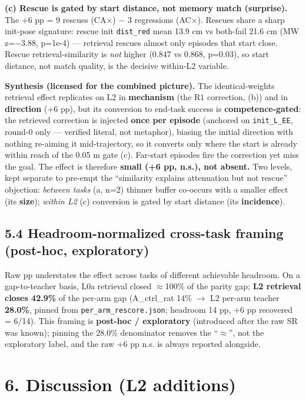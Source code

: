 \textbf{(c) Rescue is gated by start distance, not memory match (surprise).}
The +6 pp = 9 rescues (C\checkmark A$\times$) $-$ 3 regressions (A\checkmark C$\times$). Rescues share a
sharp init-pose signature: rescue init \texttt{dist\_red} mean 13.9 cm vs
both-fail 21.6 cm (MW z=$-$3.88, p=1e-4) --- retrieval rescues almost only
episodes that start close. Rescue retrieval-similarity is \emph{not} higher
(0.847 vs 0.868, p=0.03), so start distance, not match quality, is the
decisive within-L2 variable.

\textbf{Synthesis (licensed for the combined picture).} The identical-weights
retrieval effect replicates on L2 in \textbf{mechanism} (the R1 correction, (b))
and in \textbf{direction} (+6 pp), but its conversion to end-task success is
\textbf{competence-gated}: the retrieved correction is injected \textbf{once per
episode} (anchored on \texttt{init\_L\_EE}, round-0 only --- verified literal, not
metaphor), biasing the initial direction with nothing re-aiming it
mid-trajectory, so it converts only where the start is already within
reach of the 0.05 m gate (c). Far-start episodes fire the correction yet
miss the goal. The effect is therefore \textbf{small (+6 pp, n.s.), not
absent.} Two levels, kept separate to pre-empt the ``similarity explains
attenuation but not rescue'' objection: \emph{between tasks} (a, n=2) thinner
buffer co-occurs with a smaller effect (its \textbf{size}); \emph{within L2} (c)
conversion is gated by start distance (its \textbf{incidence}).

\subsection*{5.4 Headroom-normalized cross-task framing (post-hoc, exploratory)}

Raw pp understates the effect across tasks of different achievable
headroom. On a gap-to-teacher basis, L0a retrieval closed $\approx$100\% of the
parity gap; \textbf{L2 retrieval closes 42.9\%} of the per-arm gap (A\_ctrl\_rat
14\% $\rightarrow$ L2 per-arm teacher \textbf{28.0\%}, pinned from \texttt{per\_arm\_rescore.json};
headroom 14 pp, +6 pp recovered = 6/14). This framing is \textbf{post-hoc /
exploratory} (introduced after the raw SR was known); pinning the 28.0\%
denominator removes the ``$\approx$'', not the exploratory label, and the raw
+6 pp n.s. is always reported alongside.

\section*{6. Discussion (L2 additions)}

